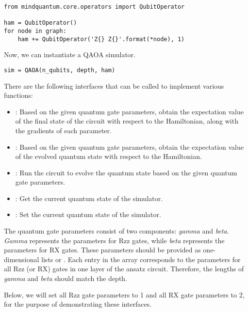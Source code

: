 \begin{lstlisting}
from mindquantum.core.operators import QubitOperator

ham = QubitOperator()
for node in graph:
    ham += QubitOperator('Z{} Z{}'.format(*node), 1)
\end{lstlisting}

Now, we can instantiate a QAOA simulator.
\begin{lstlisting}
sim = QAOA(n_qubits, depth, ham)
\end{lstlisting}

There are the following interfaces that can be called to implement various functions:

\begin{itemize}
    \item {}: Based on the given quantum gate parameters, obtain the expectation value of the final state of the circuit with respect to the Hamiltonian, along with the gradients of each parameter.
    \item {}: Based on the given quantum gate parameters, obtain the expectation value of the evolved quantum state with respect to the Hamiltonian.
    \item {}: Run the circuit to evolve the quantum state based on the given quantum gate parameters.
    \item {}: Get the current quantum state of the simulator.
    \item {}: Set the current quantum state of the simulator.
\end{itemize}

The quantum gate parameters consist of two components: \textit{gamma} and \textit{beta}. \textit{Gamma} represents the parameters for Rzz gates, while \textit{beta} represents the parameters for RX gates. These parameters should be provided as one-dimensional lists or . Each entry in the array corresponds to the parameters for all Rzz (or RX) gates in one layer of the ansatz circuit. Therefore, the lengths of \textit{gamma} and \textit{beta} should match the depth.

Below, we will set all Rzz gate parameters to 1 and all RX gate parameters to 2, for the purpose of demonstrating these interfaces.

